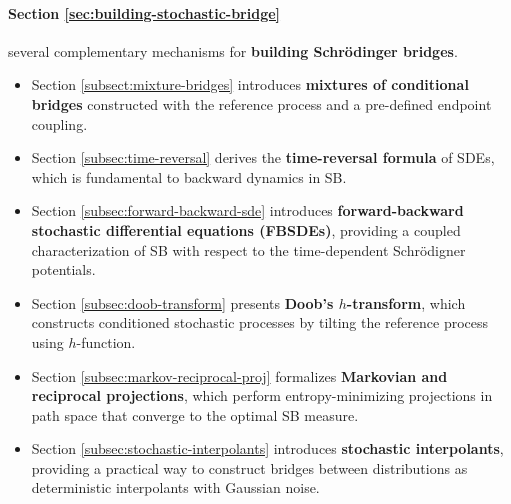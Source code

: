 \documentclass{article}
\begin{document}
\paragraph{Section \ref{sec:building-stochastic-bridge}} several complementary mechanisms for \textbf{building Schrödinger bridges}.
\begin{itemize}
    \item Section \ref{subsect:mixture-bridges} introduces \textbf{mixtures of conditional bridges} constructed with the reference process and a pre-defined endpoint coupling.
    \item Section \ref{subsec:time-reversal} derives the \textbf{time-reversal formula} of SDEs, which is fundamental to backward dynamics in SB.
    \item Section \ref{subsec:forward-backward-sde} introduces \textbf{forward-backward stochastic differential equations (FBSDEs)}, providing a coupled characterization of SB with respect to the time-dependent Schrödigner potentials.
    \item Section \ref{subsec:doob-transform} presents \textbf{Doob’s $h$-transform}, which constructs conditioned stochastic processes by tilting the reference process using $h$-function.
    \item Section \ref{subsec:markov-reciprocal-proj} formalizes \textbf{Markovian and reciprocal projections}, which perform entropy-minimizing projections in path space that converge to the optimal SB measure.
    \item Section \ref{subsec:stochastic-interpolants} introduces \textbf{stochastic interpolants}, providing a practical way to construct bridges between distributions as deterministic interpolants with Gaussian noise.
\end{itemize}
\end{document}
